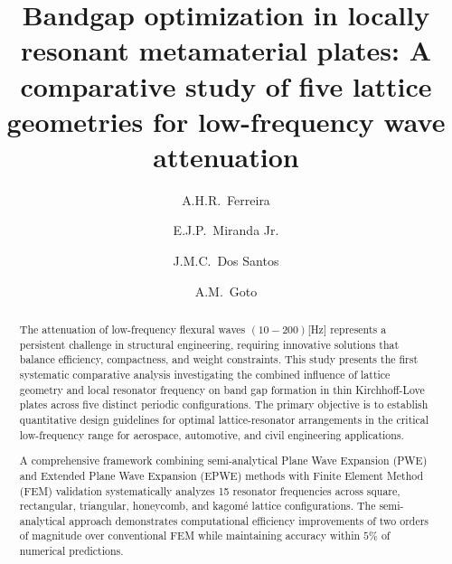 \documentclass[review,numbers,sort&compress]{elsarticle}
\begin{document}
\begin{frontmatter}

\title{Bandgap optimization in locally resonant metamaterial plates: A comparative study of five lattice geometries for      
  low-frequency wave attenuation}

\author[unicampaddress]{A.H.R.~Ferreira}

\author[ifmappgemaddress,ifmaeibaddress,valeaddress]{E.J.P.~Miranda Jr.}

\author[unicampaddress]{J.M.C.~Dos Santos}

\author[unicampaddress]{A.M.~Goto}

\address[unicampaddress]{University of Campinas, UNICAMP-FEM-DMC, Rua Mendeleyev, 200, CEP 13083-970, Campinas, SP, Brazil}
\address[ifmappgemaddress]{Federal Institute of Maranh\~{a}o, IFMA-PPGEM, CEP 65030-005, S\~{a}o Lu\'{i}s, MA, Brazil}
\address[ifmaeibaddress]{Federal Institute of Maranh\~{a}o, IFMA-EIB-DE, CEP 65010-030, S\~{a}o Lu\'{i}s, MA, Brazil}
\address[valeaddress]{Vale Institute of Technology, ITV-MI, CEP 35400-000, Ouro Preto, MG, Brazil}

\begin{abstract}
\par The attenuation of low-frequency flexural waves $(10-200)$[Hz] represents a persistent challenge in structural engineering, requiring innovative solutions that balance efficiency, compactness, and weight constraints. This study presents the first systematic comparative analysis investigating the combined influence of lattice geometry and local resonator frequency on band gap formation in thin Kirchhoff-Love plates across five distinct periodic configurations. The primary objective is to establish quantitative design guidelines for optimal lattice-resonator arrangements in the critical low-frequency range for aerospace, automotive, and civil engineering applications.

\par A comprehensive framework combining semi-analytical Plane Wave Expansion (PWE) and Extended Plane Wave Expansion (EPWE) methods with Finite Element Method (FEM) validation systematically analyzes 15 resonator frequencies across square, rectangular, triangular, honeycomb, and kagomé lattice configurations. The semi-analytical approach demonstrates computational efficiency improvements of two orders of magnitude over conventional FEM while maintaining accuracy within $5\%$ of numerical predictions.


\end{abstract}
\end{frontmatter}
\end{document}

